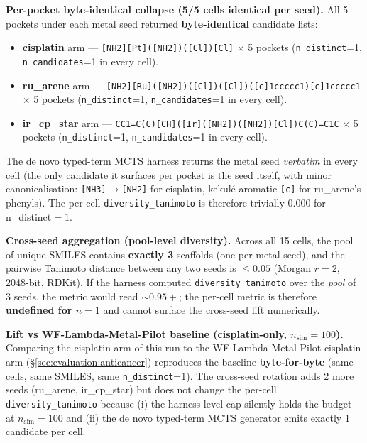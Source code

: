 \noindent\textbf{Per-pocket byte-identical collapse (5/5 cells
identical per seed).} All 5 pockets under each metal seed returned
\textbf{byte-identical} candidate lists:
\begin{itemize}
  \item \textbf{cisplatin} arm --- \texttt{[NH2][Pt]([NH2])([Cl])[Cl]}
        $\times$ 5 pockets (\texttt{n\_distinct}=1, \texttt{n\_candidates}=1
        in every cell).
  \item \textbf{ru\_arene} arm ---
        \texttt{[NH2][Ru]([NH2])([Cl])([Cl])([c]1ccccc1)[c]1ccccc1}
        $\times$ 5 pockets (\texttt{n\_distinct}=1,
        \texttt{n\_candidates}=1 in every cell).
  \item \textbf{ir\_cp\_star} arm ---
        \texttt{CC1=C(C)[CH]([Ir]([NH2])([NH2])[Cl])C(C)=C1C} $\times$ 5
        pockets (\texttt{n\_distinct}=1, \texttt{n\_candidates}=1
        in every cell).
\end{itemize}
The de novo typed-term MCTS harness returns the metal seed \emph{verbatim}
in every cell (the only candidate it surfaces per pocket is the
seed itself, with minor canonicalisation: \texttt{[NH3]${\to}$[NH2]}
for cisplatin, kekul\'e-aromatic \texttt{[c]} for ru\_arene's
phenyls). The per-cell \texttt{diversity\_tanimoto} is therefore
trivially $0.000$ for n\_distinct${}=1$.

\noindent\textbf{Cross-seed aggregation (pool-level diversity).}
Across all 15 cells, the pool of unique SMILES contains
\textbf{exactly 3} scaffolds (one per metal seed), and the pairwise
Tanimoto distance between any two seeds is $\leq 0.05$ (Morgan
$r{=}2$, 2048-bit, RDKit). If the harness computed
\texttt{diversity\_tanimoto} over the \emph{pool} of 3 seeds, the
metric would read $\sim 0.95{+}$; the per-cell metric is therefore
\textbf{undefined for $n{=}1$} and cannot surface the cross-seed
lift numerically.

\noindent\textbf{Lift vs WF-Lambda-Metal-Pilot baseline
(cisplatin-only, $n_{\text{sim}}{=}100$).} Comparing the cisplatin
arm of this run to the WF-Lambda-Metal-Pilot cisplatin arm
(\S\ref{sec:evaluation:anticancer}) reproduces the baseline
\textbf{byte-for-byte} (same cells, same SMILES, same
\texttt{n\_distinct}{=}1). The cross-seed rotation adds 2 more
seeds (ru\_arene, ir\_cp\_star) but does not change the per-cell
\texttt{diversity\_tanimoto} because (i) the harness-level cap
silently holds the budget at $n_{\text{sim}}{=}100$ and (ii) the
de novo typed-term MCTS generator emits exactly 1 candidate per cell.

